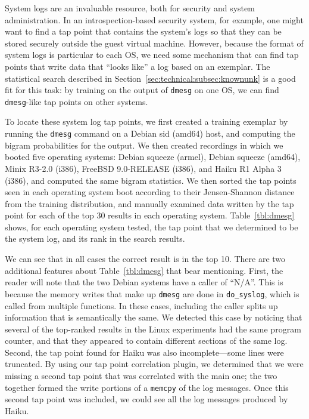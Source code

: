 System logs are an invaluable resource, both for security and system
administration. In an introspection-based security system, for example,
one might want to find a tap point that contains the system's logs so
that they can be stored securely outside the guest virtual machine.
However, because the format of system logs is particular to each OS, we
need some mechanism that can find tap points that write data that
``looks like'' a log based on an exemplar. The statistical search
described in Section~\ref{sec:technical:subsec:knownunk} is a good fit
for this task: by training on the output of \texttt{dmesg} on one
OS, we can find \texttt{dmesg}-like tap points on other systems.

To locate these system log tap points, we first created a training
exemplar by running the \texttt{dmesg} command on a Debian sid (amd64)
host, and computing the bigram probabilities for the output. We then
created recordings in which we booted five operating systems: Debian
squeeze (armel), Debian squeeze (amd64), Minix R3-2.0 (i386), FreeBSD
9.0-RELEASE (i386), and Haiku R1 Alpha 3 (i386), and computed the same
bigram statistics. We then sorted the tap points seen in each operating
system boot according to their Jensen-Shannon distance from the training
distribution, and manually examined data written by the tap point for
each of the top 30 results in each operating system. Table~\ref{tbl:dmesg}
shows, for each operating system tested, the tap point that we determined to be
the system log, and its rank in the search results.

We can see that in all cases the correct result is in the top 10. There
are two additional features about Table~\ref{tbl:dmesg} that bear
mentioning. First, the reader will note that the two Debian systems have
a caller of ``N/A''. This is because the memory writes that make up
\texttt{dmesg} are done in \texttt{do\_syslog}, which is called from
multiple functions. In these cases, including the caller splits up
information that is semantically the same. We detected this case by
noticing that several of the top-ranked results in the Linux experiments
had the same program counter, and that they appeared to contain
different sections of the same log. Second, the tap point found for
Haiku was also incomplete---some lines were truncated. By using our tap
point correlation plugin, we determined that we were missing a second
tap point that was correlated with the main one; the two together formed
the write portions of a \texttt{memcpy} of the log messages. Once this
second tap point was included, we could see all the log messages
produced by Haiku.

